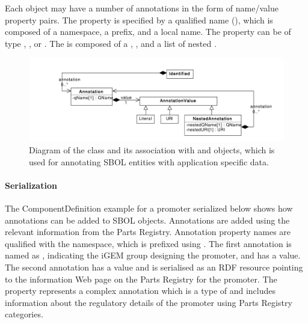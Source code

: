 Each  object may have a number of annotations in the form of name/value property pairs. The  property is specified by a qualified name (), which is composed of a namespace, a prefix, and a local name. The  property can be of type , , or . The  is composed of a , , and a list of nested .


\begin{figure}[!ht]
\begin{center}
\includegraphics[scale=0.6]{uml/identified_annotations}
\caption[]{Diagram of the  class and its association with  and  objects, which is used for annotating SBOL entities with application specific data.}
\label{uml:identified_annotations}
\end{center}
\end{figure}

\paragraph{Serialization}
The ComponentDefinition example for a promoter serialized below shows how annotations can be added to SBOL objects. Annotations are added using the relevant information from the Parts Registry. Annotation property names are qualified with the  namespace, which is prefixed using . The first annotation is named as , indicating the iGEM group designing the promoter, and has a  value. The second  annotation has a  value and is serialised as an RDF resource pointing to the information Web page on the Parts Registry for the promoter. The   property represents a complex annotation which is a type of  and includes information about the regulatory details of the promoter using Parts Registry categories.   

